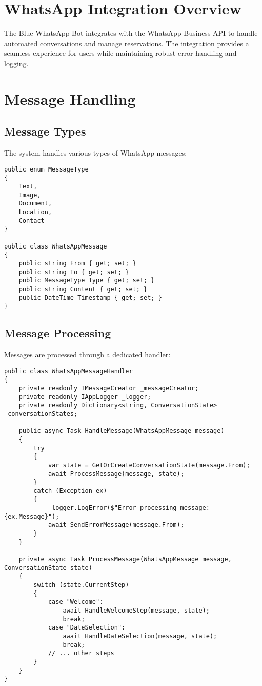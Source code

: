 \section{WhatsApp Integration Overview}
The Blue WhatsApp Bot integrates with the WhatsApp Business API to handle automated conversations and manage reservations. The integration provides a seamless experience for users while maintaining robust error handling and logging.

\section{Message Handling}

\subsection{Message Types}
The system handles various types of WhatsApp messages:

\begin{lstlisting}[language=CSharp]
public enum MessageType
{
    Text,
    Image,
    Document,
    Location,
    Contact
}

public class WhatsAppMessage
{
    public string From { get; set; }
    public string To { get; set; }
    public MessageType Type { get; set; }
    public string Content { get; set; }
    public DateTime Timestamp { get; set; }
}
\end{lstlisting}

\subsection{Message Processing}
Messages are processed through a dedicated handler:

\begin{lstlisting}[language=CSharp]
public class WhatsAppMessageHandler
{
    private readonly IMessageCreator _messageCreator;
    private readonly IAppLogger _logger;
    private readonly Dictionary<string, ConversationState> _conversationStates;

    public async Task HandleMessage(WhatsAppMessage message)
    {
        try
        {
            var state = GetOrCreateConversationState(message.From);
            await ProcessMessage(message, state);
        }
        catch (Exception ex)
        {
            _logger.LogError($"Error processing message: {ex.Message}");
            await SendErrorMessage(message.From);
        }
    }

    private async Task ProcessMessage(WhatsAppMessage message, ConversationState state)
    {
        switch (state.CurrentStep)
        {
            case "Welcome":
                await HandleWelcomeStep(message, state);
                break;
            case "DateSelection":
                await HandleDateSelection(message, state);
                break;
            // ... other steps
        }
    }
}
\end{lstlisting}

